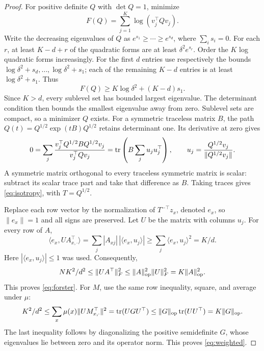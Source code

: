 \begin{proof}
For positive definite $Q$ with $\det Q=1$, minimize
\[
 F(Q)=\sum_{j=1}^K\log(v_j^\top Qv_j).
\]
Write the decreasing eigenvalues of $Q$ as $e^{s_1}\geq\cdots\geq e^{s_d}$, where $\sum_i s_i=0$. For each $r$, at least $K-d+r$ of the quadratic forms are at least $\delta^2e^{s_r}$. Order the $K$ log quadratic forms increasingly. For the first $d$ entries use respectively the bounds
$\log\delta^2+s_d,\ldots,\log\delta^2+s_1$; each of the remaining $K-d$ entries is at least $\log\delta^2+s_1$. Thus
\[
 F(Q)\geq K\log\delta^2+(K-d)s_1.
\]
Since $K>d$, every sublevel set has bounded largest eigenvalue. The determinant condition then bounds the smallest eigenvalue away from zero. Sublevel sets are compact, so a minimizer $Q$ exists.
For a symmetric traceless matrix $B$, the path
$Q(t)=Q^{1/2}\exp(tB)Q^{1/2}$ retains determinant one. Its derivative at zero gives
\[
 0=\sum_j\frac{v_j^\top Q^{1/2}BQ^{1/2}v_j}{v_j^\top Qv_j}
   =\operatorname{tr}\left(B\sum_j u_ju_j^\top\right),
 \qquad u_j=\frac{Q^{1/2}v_j}{\|Q^{1/2}v_j\|}.
\]
A symmetric matrix orthogonal to every traceless symmetric matrix is scalar: subtract its scalar trace part and take that difference as $B$. Taking traces gives \eqref{eq:isotropy}, with $T=Q^{1/2}$.

Replace each row vector by the normalization of $T^{-\top}z_x$, denoted $e_x$, so $\|e_x\|=1$ and all signs are preserved. Let $U$ be the matrix with columns $u_j$. For every row of $A$,
\[
 \langle e_x,UA_{x,\cdot}^{\top}\rangle
 =\sum_j |A_{xj}|\,|\langle e_x,u_j\rangle|
 \geq\sum_j\langle e_x,u_j\rangle^2=K/d.
\]
Here $|\langle e_x,u_j\rangle|\leq1$ was used. Consequently,
\[
 NK^2/d^2\leq\|UA^\top\|_F^2
 \leq\|A\|_{\mathrm{op}}^2\|U\|_F^2=K\|A\|_{\mathrm{op}}^2.
\]
This proves \eqref{eq:forster}. For $M$, use the same row inequality, square, and average under $\mu$:
\[
 K^2/d^2\leq\sum_x\mu(x)\|UM_{x,\cdot}^{\top}\|^2
 =\operatorname{tr}(UGU^\top)\leq\|G\|_{\mathrm{op}}\operatorname{tr}(UU^\top)=K\|G\|_{\mathrm{op}}.
\]
The last inequality follows by diagonalizing the positive semidefinite $G$, whose eigenvalues lie between zero and its operator norm. This proves \eqref{eq:weighted}.
\end{proof}

